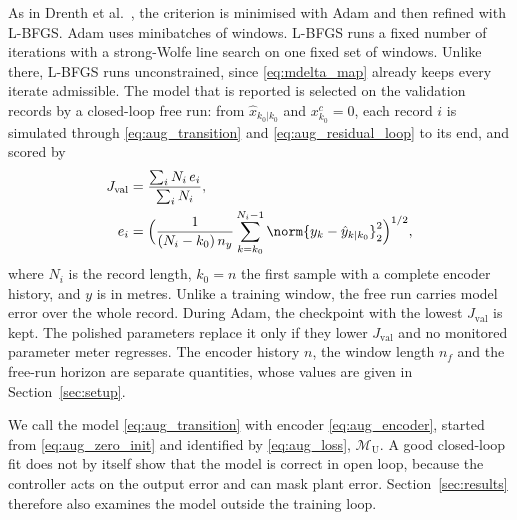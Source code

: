 As in Drenth et al.~\cite{drenth2025lpvlfr}, the criterion is minimised with
Adam and then refined with L-BFGS.
Adam uses minibatches of windows.
L-BFGS runs a fixed number of iterations with a strong-Wolfe line search on
one fixed set of windows.
Unlike there, L-BFGS runs unconstrained, since \eqref{eq:mdelta_map} already
keeps every iterate admissible.
The model that is reported is selected on the validation records by a
closed-loop free run: from $\hat x_{k_0|k_0}$ and $x^c_{k_0}=0$, each record
$i$ is simulated through \eqref{eq:aug_transition} and
\eqref{eq:aug_residual_loop} to its end, and scored by
\begin{equation}
\begin{aligned}
 J_{\mathrm{val}}
 &=\frac{\sum_i N_i\,e_i}{\sum_i N_i},\\
 e_i&=\Bigl(\frac{1}{(N_i-k_0)\,n_y}\sum_{k=k_0}^{N_i-1}
 \norm{y_k-\hat y_{k|k_0}}_2^2\Bigr)^{1/2},
\end{aligned}
 \label{eq:aug_val}
\end{equation}
where $N_i$ is the record length, $k_0=n$ the first sample with a complete
encoder history, and $y$ is in metres.
Unlike a training window, the free run carries model error over the whole
record.
During Adam, the checkpoint with the lowest $J_{\mathrm{val}}$ is kept.
The polished parameters replace it only if they lower $J_{\mathrm{val}}$ and
no monitored parameter meter regresses.
The encoder history $n$, the window length $n_f$ and the free-run horizon are
separate quantities, whose values are given in Section~\ref{sec:setup}.

We call the model \eqref{eq:aug_transition} with encoder
\eqref{eq:aug_encoder}, started from \eqref{eq:aug_zero_init} and identified
by \eqref{eq:aug_loss}, $\mathcal M_{\mathrm{U}}$.
A good closed-loop fit does not by itself show that the model is correct in
open loop, because the controller acts on the output error and can mask plant
error.
Section~\ref{sec:results} therefore also examines the model outside the
training loop.

